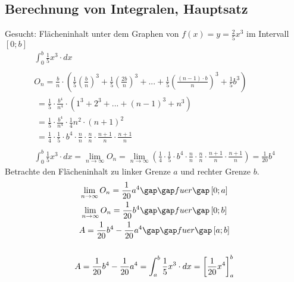 \subsection{Berechnung von Integralen, Hauptsatz}
Gesucht: Flächeninhalt unter dem Graphen von $f(x) = y = \frac{2}{5}x^3$ im Intervall $\left[0; b\right]$ \\
\begin{gather*}
  \int_0^b \frac{1}{5}x^3 \cdot dx \\\\
  O_n = \frac{b}{n} \cdot (\frac{1}{5}(\frac{b}{n})^3 + \frac{1}{5}(\frac{2b}{n})^3 + ... + \frac{1}{5}(\frac{(n - 1) \cdot b}{n})^3 + \frac{1}{5}b^3) \\
  \;= \frac{1}{5} \cdot \frac{b^4}{n^4} \cdot (1^3 + 2^3 + ... + (n - 1)^3 + n^3) \\
  \;= \frac{1}{5} \cdot \frac{b^4}{n^4} \cdot \frac{1}{4}n^2 \cdot (n + 1)^2 \\
  \;= \frac{1}{4} \cdot \frac{1}{5} \cdot b^4 \cdot \frac{n}{n} \cdot \frac{n}{n} \cdot \frac{n + 1}{n} \cdot \frac{n + 1}{n} \\\\
  \int_0^b \frac{1}{5}x^3 \cdot dx = \lim\limits_{n \to \infty} O_n = \lim\limits_{n \to \infty} (\frac{1}{4} \cdot \frac{1}{5} \cdot b^4 \cdot \frac{n}{n} \cdot \frac{n}{n} \cdot \frac{n + 1}{n} \cdot \frac{n + 1}{n}) = \frac{1}{20}b^4
\end{gather*}
Betrachte den Flächeninhalt zu linker Grenze $a$ und rechter Grenze $b$.
\begin{gather*}
  \lim\limits_{n \to \infty} O_n = \frac{1}{20}a^4 \gap\gap fuer\gap \left[0; a\right] \\
  \lim\limits_{n \to \infty} O_n = \frac{1}{20}b^4 \gap\gap fuer\gap \left[0; b\right] \\
  A = \frac{1}{20}b^4 - \frac{1}{20}a^4 \gap\gap fuer\gap \left[a; b\right] \\\\
  A = \frac{1}{20}b^4 - \frac{1}{20}a^4 = \int_a^b \frac{1}{5}x^3 \cdot dx = \left[\frac{1}{20}x^4\right]_a^b
\end{gather*}
